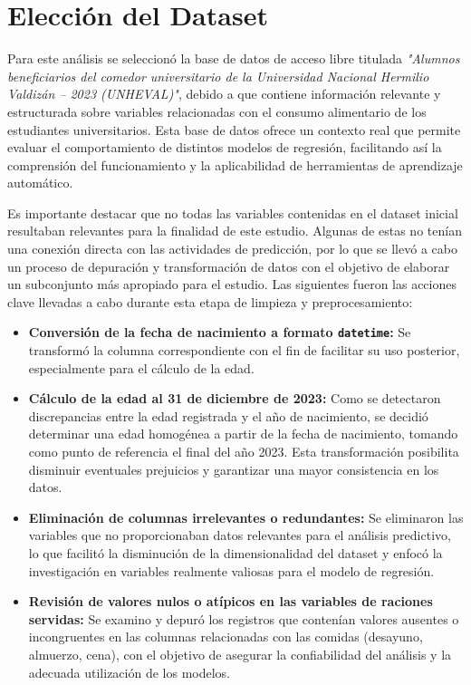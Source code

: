 \documentclass{article}
\begin{document}
\section{Elección del Dataset}

Para este análisis se seleccionó la base de datos de acceso libre titulada \textit{"Alumnos beneficiarios del comedor universitario de la Universidad Nacional Hermilio Valdizán – 2023 (UNHEVAL)"}, debido a que contiene información relevante y estructurada sobre variables relacionadas con el consumo alimentario de los estudiantes universitarios. Esta base de datos ofrece un contexto real que permite evaluar el comportamiento de distintos modelos de regresión, facilitando así la comprensión del funcionamiento y la aplicabilidad de herramientas de aprendizaje automático.

Es importante destacar que no todas las variables contenidas en el dataset inicial resultaban relevantes para la finalidad de este estudio.  Algunas de estas no tenían una conexión directa con las actividades de predicción, por lo que se llevó a cabo un proceso de depuración y transformación de datos con el objetivo de elaborar un subconjunto más apropiado para el estudio.  Las siguientes fueron las acciones clave llevadas a cabo durante esta etapa de limpieza y preprocesamiento:

\begin{itemize}
    \item \textbf{Conversión de la fecha de nacimiento a formato \texttt{datetime}:} Se transformó la columna correspondiente con el fin de facilitar su uso posterior, especialmente para el cálculo de la edad.
    
    \item \textbf{Cálculo de la edad al 31 de diciembre de 2023:} Como se detectaron discrepancias entre la edad registrada y el año de nacimiento, se decidió determinar una edad homogénea a partir de la fecha de nacimiento, tomando como punto de referencia el final del año 2023.  Esta transformación posibilita disminuir eventuales prejuicios y garantizar una mayor consistencia en los datos.
    
    \item \textbf{Eliminación de columnas irrelevantes o redundantes:} Se eliminaron las variables que no proporcionaban datos relevantes para el análisis predictivo, lo que facilitó la disminución de la dimensionalidad del dataset y enfocó la investigación en variables realmente valiosas para el modelo de regresión.
    
    \item \textbf{Revisión de valores nulos o atípicos en las variables de raciones servidas:} Se examino y depuró los registros que contenían valores ausentes o incongruentes en las columnas relacionadas con las comidas (desayuno, almuerzo, cena), con el objetivo de asegurar la confiabilidad del análisis y la adecuada utilización de los modelos.
    
\end{itemize}
\end{document}
